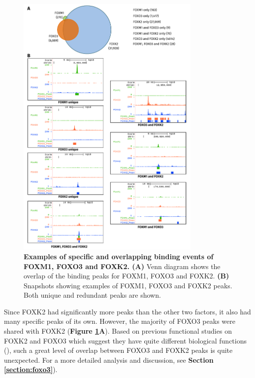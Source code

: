 \begin{figure}[!h]
    \centering
    \includegraphics[width=0.8\textwidth]{chapter3/figures_overview/fig14.pdf}
    \caption[Examples of specific and overlapping binding events of FOXM1, FOXO3 and FOXK2]{\textbf{Examples of specific and overlapping binding events of FOXM1, FOXO3 and FOXK2. (A)} Venn diagram shows the overlap of the binding peaks for FOXM1, FOXO3 and FOXK2. \textbf{(B)} Snapshots showing examples of FOXM1, FOXO3 and FOXK2 peaks. Both unique and redundant peaks are shown.}
    \label{fig:fig14}
\end{figure}

Since FOXK2 had significantly more peaks than the other two factors, it also had many specific peaks of its own. However, the majority of FOXO3 peaks were shared with FOXK2 (\textbf{Figure \ref{fig:fig14}A}). Based on previous functional studies on FOXK2 and FOXO3 which suggest they have quite different biological functions (\cite{brunet1999akt,marais2010cell,ji2012the}), such a great level of overlap between FOXO3 and FOXK2 peaks is quite unexpected. For a more detailed analysis and discussion, see \textbf{Section \ref{section:foxo3}}).

